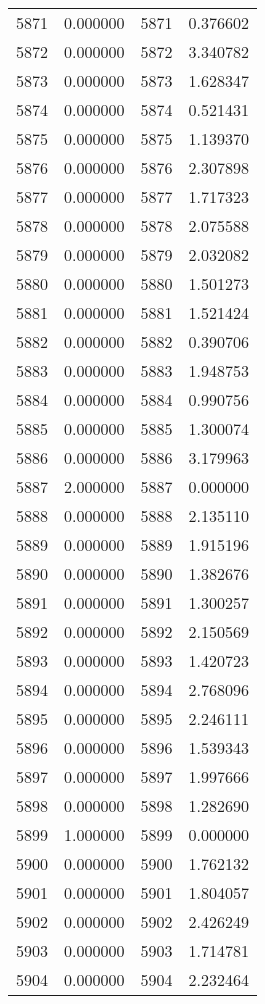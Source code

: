 \documentclass[12pt]{article}
\begin{document}
\begin{longtable}{@{}cccc@{}}
5871 & 0.000000 & 5871 & 0.376602 \\
5872 & 0.000000 & 5872 & 3.340782 \\
5873 & 0.000000 & 5873 & 1.628347 \\
5874 & 0.000000 & 5874 & 0.521431 \\
5875 & 0.000000 & 5875 & 1.139370 \\
5876 & 0.000000 & 5876 & 2.307898 \\
5877 & 0.000000 & 5877 & 1.717323 \\
5878 & 0.000000 & 5878 & 2.075588 \\
5879 & 0.000000 & 5879 & 2.032082 \\
5880 & 0.000000 & 5880 & 1.501273 \\
5881 & 0.000000 & 5881 & 1.521424 \\
5882 & 0.000000 & 5882 & 0.390706 \\
5883 & 0.000000 & 5883 & 1.948753 \\
5884 & 0.000000 & 5884 & 0.990756 \\
5885 & 0.000000 & 5885 & 1.300074 \\
5886 & 0.000000 & 5886 & 3.179963 \\
5887 & 2.000000 & 5887 & 0.000000 \\
5888 & 0.000000 & 5888 & 2.135110 \\
5889 & 0.000000 & 5889 & 1.915196 \\
5890 & 0.000000 & 5890 & 1.382676 \\
5891 & 0.000000 & 5891 & 1.300257 \\
5892 & 0.000000 & 5892 & 2.150569 \\
5893 & 0.000000 & 5893 & 1.420723 \\
5894 & 0.000000 & 5894 & 2.768096 \\
5895 & 0.000000 & 5895 & 2.246111 \\
5896 & 0.000000 & 5896 & 1.539343 \\
5897 & 0.000000 & 5897 & 1.997666 \\
5898 & 0.000000 & 5898 & 1.282690 \\
5899 & 1.000000 & 5899 & 0.000000 \\
5900 & 0.000000 & 5900 & 1.762132 \\
5901 & 0.000000 & 5901 & 1.804057 \\
5902 & 0.000000 & 5902 & 2.426249 \\
5903 & 0.000000 & 5903 & 1.714781 \\
5904 & 0.000000 & 5904 & 2.232464 \\

\end{longtable}
\end{document}
